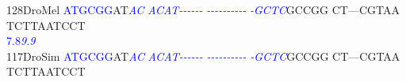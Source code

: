 \documentclass[11pt,twoside,reqno,a4paper]{article}
\begin{document}
{128\hspace*{1\charwidth}DroMel	\textcolor{blue}{A}\textcolor{blue}{T}\textcolor{blue}{G}\textcolor{blue}{C}\textcolor{blue}{G}\textcolor{blue}{G}AT\textit{\textcolor{blue}{A}}\textit{\textcolor{blue}{C}}	\textit{\textcolor{blue}{A}}\textit{\textcolor{blue}{C}}\textit{\textcolor{blue}{A}}\textit{\textcolor{blue}{T}}\textit{\textcolor{blue}{-}}\textit{\textcolor{blue}{-}}\textit{\textcolor{blue}{-}}\textit{\textcolor{blue}{-}}\textit{\textcolor{blue}{-}}\textit{\textcolor{blue}{-}}	\textit{\textcolor{blue}{-}}\textit{\textcolor{blue}{-}}\textit{\textcolor{blue}{-}}\textit{\textcolor{blue}{-}}\textit{\textcolor{blue}{-}}\textit{\textcolor{blue}{-}}\textit{\textcolor{blue}{-}}\textit{\textcolor{blue}{-}}\textit{\textcolor{blue}{-}}\textit{\textcolor{blue}{-}}	\textit{\textcolor{blue}{-}}\textit{\textcolor{blue}{G}}\textit{\textcolor{blue}{C}}\textit{\textcolor{blue}{T}}\textit{\textcolor{blue}{C}}GCCGG	CT---CGTAA	TCTTAATCCT	\\
\hspace*{4\charwidth}\hspace*{7\charwidth}\hspace*{0\charwidth}\textcolor{blue}{7.8}\hspace*{5\charwidth}\textit{\textcolor{blue}{9.9}}\hspace*{1\charwidth}\hspace*{1\charwidth}\hspace*{1\charwidth}\hspace*{1\charwidth}\hspace*{1\charwidth}\hspace*{1\charwidth}\\
117\hspace*{1\charwidth}DroSim	\textcolor{blue}{A}\textcolor{blue}{T}\textcolor{blue}{G}\textcolor{blue}{C}\textcolor{blue}{G}\textcolor{blue}{G}AT\textit{\textcolor{blue}{A}}\textit{\textcolor{blue}{C}}	\textit{\textcolor{blue}{A}}\textit{\textcolor{blue}{C}}\textit{\textcolor{blue}{A}}\textit{\textcolor{blue}{T}}\textit{\textcolor{blue}{-}}\textit{\textcolor{blue}{-}}\textit{\textcolor{blue}{-}}\textit{\textcolor{blue}{-}}\textit{\textcolor{blue}{-}}\textit{\textcolor{blue}{-}}	\textit{\textcolor{blue}{-}}\textit{\textcolor{blue}{-}}\textit{\textcolor{blue}{-}}\textit{\textcolor{blue}{-}}\textit{\textcolor{blue}{-}}\textit{\textcolor{blue}{-}}\textit{\textcolor{blue}{-}}\textit{\textcolor{blue}{-}}\textit{\textcolor{blue}{-}}\textit{\textcolor{blue}{-}}	\textit{\textcolor{blue}{-}}\textit{\textcolor{blue}{G}}\textit{\textcolor{blue}{C}}\textit{\textcolor{blue}{T}}\textit{\textcolor{blue}{C}}GCCGG	CT---CGTAA	TCTTAATCCT	\\
}
\end{document}
